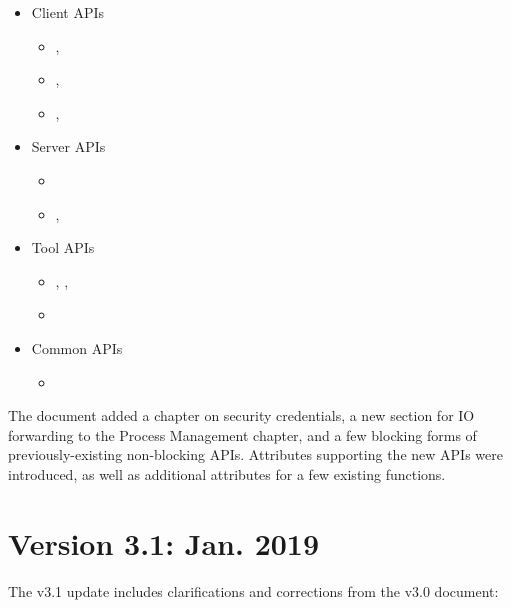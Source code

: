 \begin{itemize}
\item Client APIs
\begin{itemize}
\item {}, 
\item {}, 
\item {}, 
\end{itemize}
\item Server \acp{API}
\begin{itemize}
\item {}
\item {}, 
\end{itemize}
\item Tool \acp{API}
\begin{itemize}
\item {}, , 
\item {}
\end{itemize}
\item Common \acp{API}
\begin{itemize}
\item {}
\end{itemize}
\end{itemize}

The document added a chapter on security credentials, a new section for \ac{IO} forwarding to the Process Management chapter, and a few blocking forms of previously-existing non-blocking \acp{API}. Attributes supporting the new \acp{API} were introduced, as well as additional attributes for a few existing functions.

\section{Version 3.1: Jan. 2019}

The v3.1 update includes clarifications and corrections from the v3.0 document:

